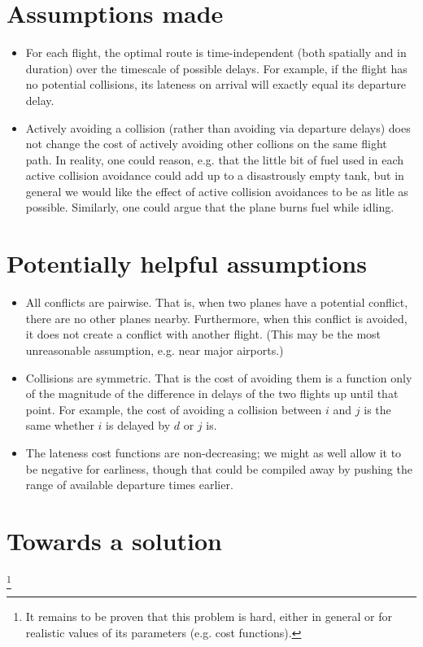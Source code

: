 \documentclass{article}
\begin{document}
\section{Assumptions made}
\begin{itemize}
\item For each flight, the optimal route is time-independent (both spatially and in duration) over the timescale of possible delays.
For example, if the flight has no potential collisions, its lateness on arrival will exactly equal its departure delay.
\item Actively avoiding a collision (rather than avoiding via departure delays) does not change the cost of actively avoiding other collions on the same flight path. In reality, one could reason, e.g. that the little bit of fuel used in each active collision avoidance could add up to a disastrously empty tank, but in general we would like the effect of active collision avoidances to be as litle as possible.
Similarly, one could argue that the plane burns fuel while idling.
\end{itemize}

\section{Potentially helpful assumptions}
\begin{itemize}
\item All conflicts are pairwise. That is, when two planes have a potential conflict, there are no other planes nearby. 
Furthermore, when this conflict is avoided, it does not create a conflict with another flight. 
(This may be the most unreasonable assumption, e.g. near major airports.)
\item Collisions are symmetric. That is the cost of avoiding them is a function only of the magnitude of the difference in delays of the two flights up until that point. For example, the cost of avoiding a collision between $i$ and $j$ is the same whether $i$ is delayed by $d$ or $j$ is.
\item The lateness cost functions are non-decreasing; we might as well allow it to be negative for earliness, though that could be compiled away by pushing the range of available departure times earlier.
\end{itemize}

\section{Towards a solution}\footnote{
It remains to be proven that this problem is hard, either in general or for realistic values of its parameters (e.g. cost functions).}
\end{document}
